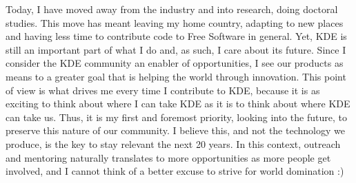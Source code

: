 Today, I have moved away from the industry and into research, doing
doctoral studies. This move has meant leaving my home country,
adapting to new places and having less time to contribute code to Free
Software in general. Yet, KDE is still an important part of what I do
and, as such, I care about its future. Since I consider the KDE
community an enabler of opportunities, I see our products as means to
a greater goal that is helping the world through innovation. This
point of view is what drives me every time I contribute to KDE,
because it is as exciting to think about where I can take KDE as it is
to think about where KDE can take us. Thus, it is my first and
foremost priority, looking into the future, to preserve this nature of
our community. I believe this, and not the technology we produce, is
the key to stay relevant the next 20 years. In this context, outreach
and mentoring naturally translates to more opportunities as more
people get involved, and I cannot think of a better excuse to strive
for world domination :)
